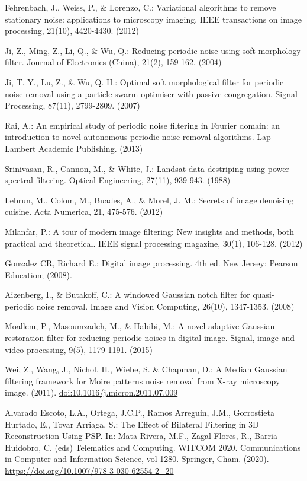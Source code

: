 \documentclass[10pt,letterpaper]{article}
\begin{document}
\begin{thebibliography}{0}
Fehrenbach, J., Weiss, P., \& Lorenzo, C.: Variational algorithms to remove stationary noise: applications to microscopy imaging. IEEE transactions on image processing, 21(10), 4420-4430. (2012)

Ji, Z., Ming, Z., Li, Q., \& Wu, Q.: Reducing periodic noise using soft morphology filter. Journal of Electronics (China), 21(2), 159-162. (2004)

Ji, T. Y., Lu, Z., \& Wu, Q. H.:  Optimal soft morphological filter for periodic noise removal using a particle swarm optimiser with passive congregation. Signal Processing, 87(11), 2799-2809. (2007)

Rai, A.: An empirical study of periodic noise filtering in Fourier domain: an introduction to novel autonomous periodic noise removal algorithms. Lap Lambert Academic Publishing. (2013)

Srinivasan, R., Cannon, M., \& White, J.: Landsat data destriping using power spectral filtering. Optical Engineering, 27(11), 939-943. (1988)

Lebrun, M., Colom, M., Buades, A., \& Morel, J. M.: Secrets of image denoising cuisine. Acta Numerica, 21, 475-576. (2012)

Milanfar, P.: A tour of modern image filtering: New insights and methods, both practical and theoretical. IEEE signal processing magazine, 30(1), 106-128. (2012)

Gonzalez CR, Richard E.: Digital image processing. 4th ed. New Jersey: Pearson Education; (2008).

Aizenberg, I., \& Butakoff, C.: A windowed Gaussian notch filter for quasi-periodic noise removal. Image and Vision Computing, 26(10), 1347-1353. (2008)

Moallem, P., Masoumzadeh, M., \& Habibi, M.: A novel adaptive Gaussian restoration filter for reducing periodic noises in digital image. Signal, image and video processing, 9(5), 1179-1191. (2015)

Wei, Z., Wang, J., Nichol, H., Wiebe, S. \& Chapman, D.: A Median Gaussian filtering framework for Moire patterns noise removal from X-ray microscopy image. (2011). \url{doi:10.1016/j.micron.2011.07.009}

Alvarado Escoto, L.A., Ortega, J.C.P., Ramos Arreguin, J.M., Gorrostieta Hurtado, E., Tovar Arriaga, S.: The Effect of Bilateral Filtering in 3D Reconstruction Using PSP. In: Mata-Rivera, M.F., Zagal-Flores, R., Barria-Huidobro, C. (eds) Telematics and Computing. WITCOM 2020. Communications in Computer and Information Science, vol 1280. Springer, Cham. (2020). \url{https://doi.org/10.1007/978-3-030-62554-2\_20}


\end{thebibliography}
\end{document}
